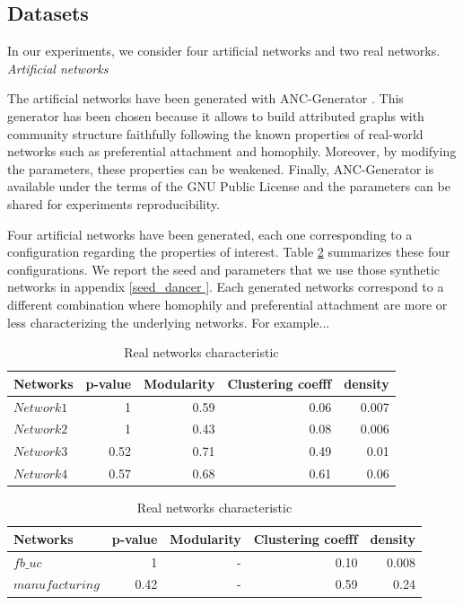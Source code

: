 \subsection{Datasets}
In our experiments, we consider four artificial networks and two real networks.\\

\textit{Artificial networks}

The artificial networks have been generated with ANC-Generator \cite{largeron2015}. This generator has been chosen because it allows to build attributed graphs with  community structure faithfully following the known properties of real-world networks such as preferential attachment and homophily.
Moreover, by modifying the parameters, these properties can be weakened. Finally, ANC-Generator is available under the terms of the GNU Public License and the        parameters can be shared for experiments reproducibility.

Four artificial networks have been generated, each one corresponding to a configuration  regarding the properties of interest.
Table \ref{table:artificial_networks} summarizes these four configurations. We report the seed and parameters that we use those synthetic networks in appendix \ref{seed_dancer	}. Each generated networks correspond to a different combination where homophily and preferential attachment are more or less characterizing the underlying networks. For example...

\begin{table}[h] \label{table:artificial_networks}
	\caption{Artificial networks characteristic.}
	\begin{tabular}{lrrrr}
		\hline
		Networks   &  p-value    &  Modularity & Clustering coefff & density   \\
		\hline
		$Network1$    & 1 &0.59  & 0.06 & 0.007  \\
		$Network2$   & 1 &0.43  & 0.08 & 0.006\\
		$Network3$  & 0.52  &0.71  & 0.49 & 0.01 \\
		$Network4$   & 0.57  &0.68  & 0.61 & 0.06 \\
		\hline
	\end{tabular}
	\caption{Real networks characteristic}
	\begin{tabular}{lrrrr}
		\hline
		Networks    &  p-value    &  Modularity & Clustering coefff & density   \\
		\hline
		$fb\_uc$          & 1 & -  & 0.10 & 0.008 \\
		$manufacturing$   & 0.42 & -  & 0.59 & 0.24 \\
	\end{tabular}
\end{table}

